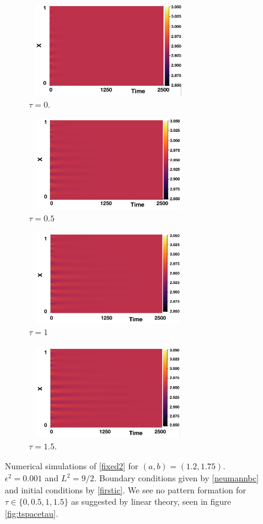 \begin{figure}[H]
    \centering
    \begin{subfigure}[t]{0.45\textwidth}
        \centering
        \includegraphics[width=7cm,height=4cm]{p3t0.png}
        \caption{$\tau=0$.}
        \label{}
    \end{subfigure}
    \hfill
    \begin{subfigure}[t]{0.45\textwidth}
        \centering
        \includegraphics[width=7cm,height=4cm]{p3t05.png}
        \caption{$\tau=0.5$}
        \label{}
    \end{subfigure}
    \hfill
    \begin{subfigure}[t]{0.45\textwidth}
        \centering
        \includegraphics[width=7cm,height=4cm]{p3t1.png}
        \caption{$\tau=1$}
        \label{}
    \end{subfigure}
    \hfill
    \begin{subfigure}[t]{0.45\textwidth}
        \centering
        \includegraphics[width=7cm,height=4cm]{p3t15.png}
        \caption{$\tau=1.5$.}
        \label{}
    \end{subfigure}
    \caption{Numerical simulations of \eqref{fixed2} for $(a,b)=(1.2,1.75)$. $\epsilon^2=0.001$ and $L^2=9/2$. Boundary conditions given by \eqref{neumannbc} and initial conditions by \eqref{firstic}. We see no pattern formation for $\tau\in\{0,0.5,1,1.5\}$ as suggested by linear theory, seen in figure \ref{fig:tspacetau}.}
    \label{fig:testturing2}
\end{figure}

